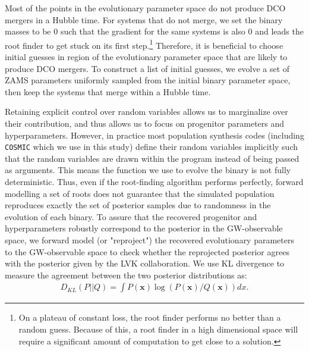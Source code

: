 \documentclass[twocolumn]{aastex631}
\begin{document}
Most of the points in the evolutionary parameter space do not produce DCO mergers in a Hubble time. For systems that do not merge, 
we set the binary masses to be $0$ such that the gradient for the same systems is also $0$ and leads the root finder to get stuck on 
its first step.{\footnote{On a plateau of constant loss, the root finder performs no better than a random guess. 
Because of this, a root finder in a high dimensional space will require a significant amount of computation
to get close to a solution.}} Therefore, it is beneficial to choose initial guesses in region of the evolutionary parameter 
space that are likely to produce DCO mergers. To construct a list of initial guesses, we evolve a set of 
ZAMS parameters uniformly sampled from the initial binary parameter space, then keep the systems that 
merge within a Hubble time.

Retaining explicit control over random variables allows us to marginalize over their contribution, 
and thus allows us to focus on progenitor parameters and hyperparameters.
However, in practice most population synthesis codes (including \texttt{COSMIC} which we use in this study) 
define their random variables implicitly such that the random variables are drawn within the program instead of 
being passed as arguments. This means the function we use to evolve the binary is not fully deterministic.
Thus, even if the root-finding algorithm performs perfectly, forward modelling a set of roots does not 
guarantee that the simulated population reproduces exactly the set of posterior samples due to 
randomness in the evolution of each binary. To assure that the recovered progenitor and hyperparameters 
robustly correspond to the posterior in the GW-observable space, we forward model (or "reproject") the recovered 
evolutionary parameters to the GW-observable space to check whether the reprojected posterior agrees 
with the posterior given by the LVK collaboration. We use KL divergence to measure the agreement between the two posterior 
distributions as:
\begin{align}
D_{KL}(P||Q) = \int P(\bm{x}) \log(P(\bm{x})/Q(\bm{x})) dx.
\label{eq:KLdivergence}
\end{align}
\end{document}
